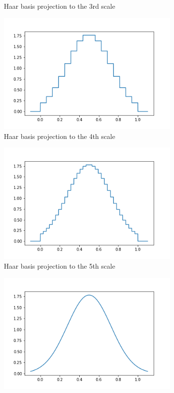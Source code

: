 \documentclass[../Thesis.tex]{subfiles}
\begin{document}
\begin{figure}[h!]
\begin{subfigure}[b]{0.49\linewidth}
    \caption{Haar basis projection to the 3rd scale}
  \end{subfigure}
  \begin{subfigure}[b]{0.49\linewidth}
    \includegraphics[width=\linewidth]{img/scale4.png}
    \caption{Haar basis projection to the 4th scale}
  \end{subfigure}
  \begin{subfigure}[b]{0.49\linewidth}
    \includegraphics[width=\linewidth]{img/scale5.png}
    \caption{Haar basis projection to the 5th scale}
  \end{subfigure}
  \begin{subfigure}[b]{0.49\linewidth}
    \includegraphics[width=\linewidth]{img/gaussian.png}

\end{subfigure}
\end{figure}
\end{document}
